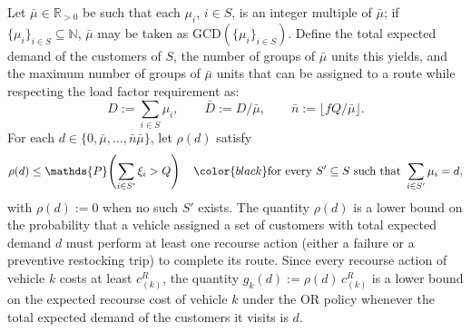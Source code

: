 \documentclass{article}
\newcommand{\rev}[1]{{\color{black}#1}}
\begin{document}
Let $\bar\mu \in \mathbb{R}_{>0}$ be such that each $\mu_i$, $i \in S$, is an integer multiple of $\bar\mu$; if $\{\mu_i\}_{i \in S} \subseteq \mathbb{N}$, $\bar\mu$ may be taken as $\mathrm{GCD}(\{\mu_i\}_{i \in S})$. \rev{Define the total expected demand of the customers of $S$, the number of groups of $\bar{\mu}$ units this yields, and the maximum number of groups of $\bar{\mu}$ units that can be assigned to a route while respecting the load factor requirement as:
\[
D := \sum_{i \in S}\mu_i, \qquad \bar D := D/\bar\mu, \qquad \bar n := \lfloor fQ/\bar\mu \rfloor.
\]}
\rev{For each $d \in \{0,\bar\mu,\dots,\bar n \bar\mu\}$}, let $\rho(d)$ satisfy
\begin{equation}\label{eq:rho_lower_envelope}
\rho(d)
\leq
\mathds{P}\!\left(\sum_{i \in S'} \xi_i > Q\right)
\quad
\rev{\text{for every } S' \subseteq S \text{ such that } \sum_{i \in S'}\mu_i = d,}
\end{equation}
\rev{with $\rho(d) := 0$ when no such $S'$ exists. The quantity $\rho(d)$ is a lower bound on the probability that a vehicle assigned a set of customers with total expected demand $d$} must perform at least one recourse action (either a failure or a preventive restocking trip) to complete its route. Since every recourse action of vehicle $k$ costs at least $c^R_{(k)}$, the quantity $g_k(d) := \rho(d) \, c^R_{(k)}$
is a lower bound on the expected recourse cost of vehicle $k$ under the OR policy whenever the total expected demand of the customers it visits is $d$.
\end{document}
